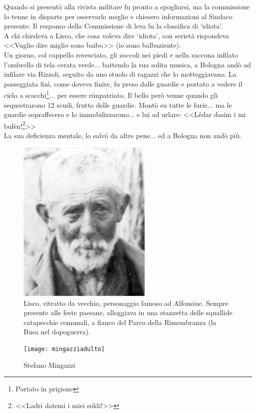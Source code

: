 \indent Quando si presentò alla rivista militare fu pronto a spogliarsi, ma la commissione lo tenne in disparte per osservarlo meglio e chiesero informazioni al Sindaco presente. Il responso della Commissione di leva fu la classifica di `idiota'.\\
\indent A chi chiedeva a Lisco, che cosa voleva dire `idiota', con serietà rispondeva <<Vuglio dire miglio sono baibo>> (io sono balbuziente).\\
\indent Un giorno, col cappello rovesciato, gli zoccoli nei piedi e nella saccona infilato l'ombrello di tela cerata verde... battendo la sua solita musica, a Bologna andò ad infilare via Rizzoli, seguito da uno stuolo di ragazzi che lo motteggiavano. La passeggiata finì, come doveva finire, fu preso dalle guardie e portato a vedere il cielo a scacchi\footnote{Portato in prigione}... per essere rimpatriato. Il bello però venne quando gli sequestrarono 12 scudi, frutto delle guardie. Montò su tutte le furie... ma le guardie sopraffecero e lo immobilizzarono... e lui ad urlare: <<Lêdar dasim i mi bulèn!\footnote{<<Ladri datemi i miei soldi!>>}>>\\
\indent La sua deficienza mentale, lo salvò da altre pene... ed a Bologna non andò più.\\

 \begin{figure}[htb]
    \centering
    \includegraphics[height=8cm]{Lisco}
    \caption[Lisco]{Lisco, ritratto da vecchio, personaggio famoso ad Alfonsine. Sempre presente alle feste paesane, alloggiava in una stanzetta delle squallide catapecchie comunali, a fianco del Parco della Rimembranza (la Busa nel dopoguerra)\label{fig:Lisco}.}
\end{figure}

\newpage

 \begin{figure}[htb]
    \centering
    \texttt{[image: mingazziadulto]}
    \caption[Stefano Mingazzi]{Stefano Mingazzi\label{fig:mingazziadulto}}
\end{figure}


